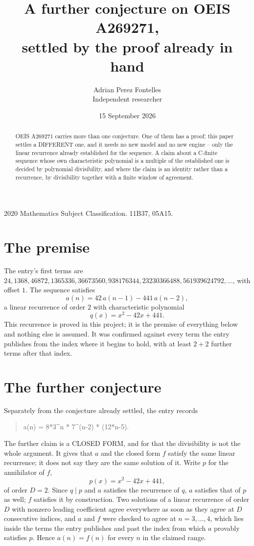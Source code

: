 \documentclass[11pt,a4paper]{article}
\title{A further conjecture on OEIS A269271,\\ \large settled by the proof already in hand}
\author{Adrian Perez Fontelles\\ \small Independent researcher}
\date{15 September 2026}
\theoremstyle{plain}
\theoremstyle{definition}
\begin{document}
\maketitle

\begin{abstract}
OEIS A269271 carries more than one conjecture. One of them has a proof; this paper settles a
DIFFERENT one, and it needs no new model and no new engine -- only the linear recurrence already
established for the sequence. A claim about a C-finite sequence whose own characteristic
polynomial is a multiple of the established one is decided by polynomial divisibility, and where
the claim is an identity rather than a recurrence, by divisibility together with a finite window
of agreement.
\end{abstract}

\noindent\small 2020 Mathematics Subject Classification. 11B37, 05A15.\normalsize

\section{The premise}

The entry's first terms are $24, 1368, 46872, 1365336, 36673560, 938176344, 23230366488, 561939624792,\dots$, with offset $1$. The sequence satisfies
\[
  a(n)=42\,a(n-1) - 441\,a(n-2) ,
\]
a linear recurrence of order $2$ with characteristic polynomial
\[
  q(x)=x^{2} - 42 x + 441 .
\]
This recurrence is proved in this project; it is the premise of everything below and nothing else is assumed.
It was confirmed against every term the entry publishes from the index where it begins to hold,
with at least $2+2$ further terms after that index.

\section{The further conjecture}

Separately from the conjecture already settled, the entry records

\begin{quote}\raggedright a(n) = 8*3\^{}n * 7\^{}(n-2) * (12*n-5).\end{quote}

The further claim is a CLOSED FORM, and for that the divisibility is not the whole argument. It
gives that $a$ and the closed form $f$ satisfy the same linear recurrence; it does not say they
are the same solution of it. Write $p$ for the annihilator of $f$,
\[
  p(x)=x^{2} - 42 x + 441 ,
\]
of order $D=2$. Since $q\mid p$ and $a$ satisfies the recurrence of $q$, $a$ satisfies that of
$p$ as well; $f$ satisfies it by construction. Two solutions of a linear recurrence of order $D$
with nonzero leading coefficient agree everywhere as soon as they agree at $D$ consecutive
indices, and $a$ and $f$ were checked to agree at $n=3,\dots,4$,
which lies inside the terms the entry publishes and past the index from which $a$ provably
satisfies $p$. Hence $a(n)=f(n)$ for every $n$ in the claimed range.
\end{document}
